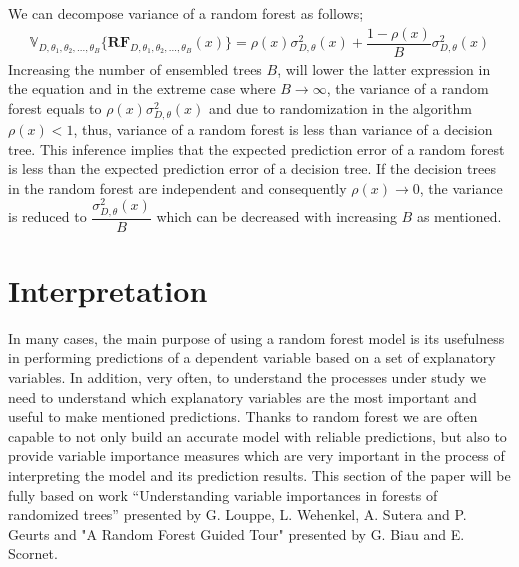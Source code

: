 We can decompose variance of a random forest as follows;
\begin{align}\label{eq:decomp_var}
\mathbb{V}_{D, \theta_{1}, \theta_{2},..., \theta_{B}}\{\boldsymbol{RF}_{D, \theta_{1},\theta_{2},..., \theta_{B}}(x) \}  = \rho(x)\sigma^2_{D,\theta}(x) + \dfrac{1-\rho(x)}{B}\sigma^2_{D,\theta}(x)
\end{align}
Increasing the number of ensembled trees $B$, will lower the latter expression in the equation and in the extreme case where $B \rightarrow \infty $, the variance of a random forest equals to $\rho(x)\sigma^2_{D,\theta}(x)$ and due to randomization in the algorithm $\rho(x) < 1$, thus, variance of a random forest is less than variance of a decision tree. This inference implies that the expected prediction error of a random forest is less than the expected prediction error of a decision tree. If the decision trees in the random forest are independent and consequently $\rho(x) \rightarrow 0$, the variance is reduced to $\dfrac{\sigma^2_{D,\theta}(x)}{B}$ which can be decreased with increasing $B$ as mentioned.



\section{Interpretation}
In many cases, the main purpose of using a random forest model is its usefulness in performing predictions of a dependent variable based on a set of explanatory variables. In addition, very often, to understand the processes under study we need to understand which explanatory variables are the most important and useful to make mentioned predictions. Thanks to random forest we are often capable to not only build an accurate model with reliable predictions, but also to provide variable importance measures which are very important in the process of interpreting the model and its prediction results. This section of the paper will be fully based on work “Understanding variable importances in forests of randomized trees” presented by G. Louppe, L. Wehenkel, A. Sutera and P. Geurts and "A Random Forest Guided Tour" presented by G. Biau and E. Scornet.

